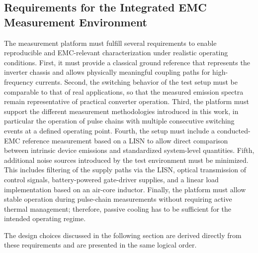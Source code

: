 
\subsection{Requirements for the Integrated EMC Measurement Environment}

The measurement platform must fulfill several requirements to enable reproducible and EMC-relevant characterization under realistic operating conditions.
First, it must provide a classical ground reference that represents the inverter chassis and allows physically meaningful coupling paths for high-frequency currents.
Second, the switching behavior of the test setup must be comparable to that of real applications, so that the measured emission spectra remain representative of practical converter operation.
Third, the platform must support the different measurement methodologies introduced in this work, in particular the operation of pulse chains with multiple consecutive switching events at a defined operating point.
Fourth, the setup must include a conducted-EMC reference measurement based on a LISN to allow direct comparison between intrinsic device emissions and standardized system-level quantities.
Fifth, additional noise sources introduced by the test environment must be minimized.
This includes filtering of the supply paths via the LISN, optical transmission of control signals, battery-powered gate-driver supplies, and a linear load implementation based on an air-core inductor.
Finally, the platform must allow stable operation during pulse-chain measurements without requiring active thermal management; therefore, passive cooling has to be sufficient for the intended operating regime.

The design choices discussed in the following section are derived directly from these requirements and are presented in the same logical order.
